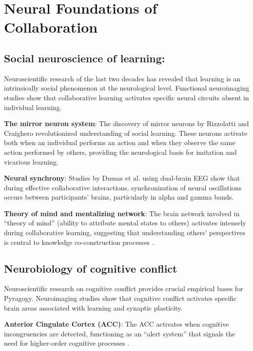 \section{Neural Foundations of Collaboration}
\subsection*{Social neuroscience of learning:}

Neuroscientific research of the last two decades has revealed that learning is an intrinsically social phenomenon at the neurological level. Functional neuroimaging studies show that collaborative learning activates specific neural circuits absent in individual learning.

\textbf{The mirror neuron system}: The discovery of mirror neurons by Rizzolatti and Craighero \cite{Rizzolatti2004} revolutionized understanding of social learning. These neurons activate both when an individual performs an action and when they observe the same action performed by others, providing the neurological basis for imitation and vicarious learning.

\textbf{Neural synchrony}: Studies by Dumas et al. \cite{Dumas2010} using dual-brain EEG show that during effective collaborative interactions, synchronization of neural oscillations occurs between participants' brains, particularly in alpha and gamma bands.

\textbf{Theory of mind and mentalizing network}: The brain network involved in ``theory of mind'' (ability to attribute mental states to others) activates intensely during collaborative learning, suggesting that understanding others' perspectives is central to knowledge co-construction processes \cite{Frith2012}.

\subsection{Neurobiology of cognitive conflict}

Neuroscientific research on cognitive conflict provides crucial empirical bases for Pyragogy. Neuroimaging studies show that cognitive conflict activates specific brain areas associated with learning and synaptic plasticity.

\textbf{Anterior Cingulate Cortex (ACC)}: The ACC activates when cognitive incongruencies are detected, functioning as an ``alert system'' that signals the need for higher-order cognitive processes \cite{Botvinick2004}.

